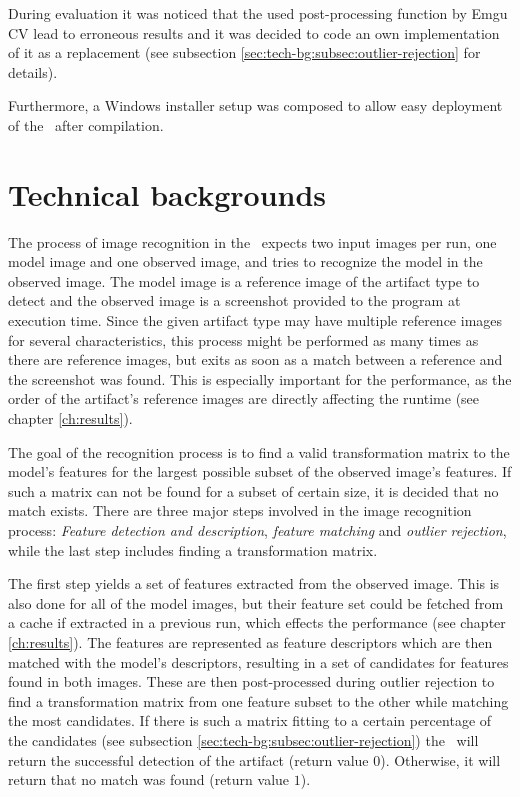 During evaluation it was noticed that the used post-processing function by Emgu CV lead to erroneous results and it was decided to code an own implementation of it as a replacement (see subsection \ref{sec:tech-bg:subsec:outlier-rejection} for details).

Furthermore, a Windows installer setup was composed to allow easy deployment of the \vd~after compilation.

\section{Technical backgrounds}\label{sec:tech-bg}

The process of image recognition in the \vd~expects two input images per run, one model image and one observed image, and tries to recognize the model in the observed image. The model image is a reference image of the artifact type to detect and the observed image is a screenshot provided to the program at execution time. Since the given artifact type may have multiple reference images for several characteristics, this process might be performed as many times as there are reference images, but exits as soon as a match between a reference and the screenshot was found. This is especially important for the performance, as the order of the artifact's reference images are directly affecting the runtime (see chapter \ref{ch:results}).

The goal of the recognition process is to find a valid transformation matrix to the model's features for the largest possible subset of the observed image's features. If such a matrix can not be found for a subset of certain size, it is decided that no match exists. There are three major steps involved in the image recognition process: \emph{Feature detection and description}, \emph{feature matching} and \emph{outlier rejection}, while the last step includes finding a transformation matrix.

The first step yields a set of features extracted from the observed image. This is also done for all of the model images, but their feature set could be fetched from a cache if extracted in a previous run, which effects the performance (see chapter \ref{ch:results}). The features are represented as feature descriptors which are then matched with the model's descriptors, resulting in a set of candidates for features found in both images. These are then post-processed during outlier rejection to find a transformation matrix from one feature subset to the other while matching the most candidates. If there is such a matrix fitting to a certain percentage of the candidates (see subsection \ref{sec:tech-bg:subsec:outlier-rejection}) the \vd~will return the successful detection of the artifact (return value $0$). Otherwise, it will return that no match was found (return value $1$).

